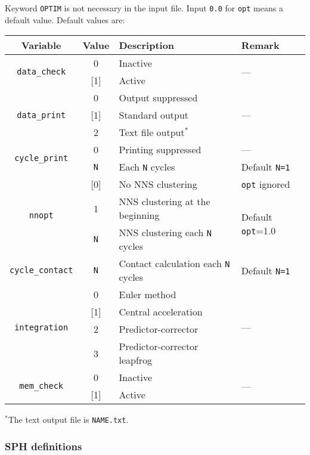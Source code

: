 Keyword \texttt{OPTIM} is not necessary in the input file. Input \texttt{0.0} for \texttt{opt} means a default value. Default values are:

\begin{tabular}{|c|c|l|l|}
\hline
{\bf Variable} & {\bf Value} & {\bf Description} & {\bf Remark} \\ \hline
\multirow{2}{*}{\texttt{data\_check}} & 0 & Inactive & \multirow{2}{*}{---} \\ \cline{2-3}
& [1] & Active & \\ \hline
\multirow{3}{*}{\texttt{data\_print}} & 0 & Output suppressed & \multirow{3}{*}{---} \\ \cline{2-3}
& [1] & Standard output & \\ \cline{2-3}
& 2 & Text file output$^*$ & \\ \hline
\multirow{2}{*}{\texttt{cycle\_print}} & 0 & Printing suppressed & --- \\ \cline{2-4}
& \texttt{N} & Each \texttt{N} cycles & Default \texttt{N=1} \\ \hline
\multirow{3}{*}{\texttt{nnopt}} & [0] & No NNS clustering & \texttt{opt} ignored \\ \cline{2-4}
& 1 & NNS clustering at the beginning & \multirow{2}{*}{Default \texttt{opt}=1.0} \\ \cline{2-3}
& \texttt{N} & NNS clustering each \texttt{N} cycles & \\ \hline
\texttt{cycle\_contact} & \texttt{N} & Contact calculation each \texttt{N} cycles & Default \texttt{N=1} \\ \hline
\multirow{4}{*}{\texttt{integration}} & 0 & Euler method & \multirow{4}{*}{---} \\ \cline{2-3}
& [1] & Central acceleration & \\ \cline{2-3}
& 2 & Predictor-corrector & \\ \cline{2-3}
& 3 & Predictor-corrector leapfrog & \\ \hline
\multirow{2}{*}{\texttt{mem\_check}} & 0 & Inactive & \multirow{2}{*}{---} \\ \cline{2-3}
& [1] & Active & \\ \cline{2-4} \hline
\end{tabular}

$^*$The text output file is \texttt{NAME.txt}.

\newpage


\subsubsection{SPH definitions}

